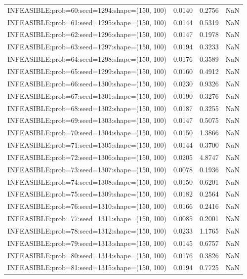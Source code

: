 \begin{longtable}{lccc}
INFEASIBLE:prob=60:seed=1294:shape=(150, 100)  &   0.0140 &  0.2756 &    NaN \\
INFEASIBLE:prob=61:seed=1295:shape=(150, 100)  &   0.0144 &  0.5319 &    NaN \\
INFEASIBLE:prob=62:seed=1296:shape=(150, 100)  &   0.0147 &  0.1978 &    NaN \\
INFEASIBLE:prob=63:seed=1297:shape=(150, 100)  &   0.0194 &  0.3233 &    NaN \\
INFEASIBLE:prob=64:seed=1298:shape=(150, 100)  &   0.0176 &  0.3589 &    NaN \\
INFEASIBLE:prob=65:seed=1299:shape=(150, 100)  &   0.0160 &  0.4912 &    NaN \\
INFEASIBLE:prob=66:seed=1300:shape=(150, 100)  &   0.0230 &  0.9326 &    NaN \\
INFEASIBLE:prob=67:seed=1301:shape=(150, 100)  &   0.0190 &  0.3276 &    NaN \\
INFEASIBLE:prob=68:seed=1302:shape=(150, 100)  &   0.0187 &  0.3255 &    NaN \\
INFEASIBLE:prob=69:seed=1303:shape=(150, 100)  &   0.0147 &  0.5075 &    NaN \\
INFEASIBLE:prob=70:seed=1304:shape=(150, 100)  &   0.0150 &  1.3866 &    NaN \\
INFEASIBLE:prob=71:seed=1305:shape=(150, 100)  &   0.0144 &  0.3700 &    NaN \\
INFEASIBLE:prob=72:seed=1306:shape=(150, 100)  &   0.0205 &  4.8747 &    NaN \\
INFEASIBLE:prob=73:seed=1307:shape=(150, 100)  &   0.0078 &  0.1936 &    NaN \\
INFEASIBLE:prob=74:seed=1308:shape=(150, 100)  &   0.0150 &  0.6201 &    NaN \\
INFEASIBLE:prob=75:seed=1309:shape=(150, 100)  &   0.0182 &  0.2564 &    NaN \\
INFEASIBLE:prob=76:seed=1310:shape=(150, 100)  &   0.0166 &  0.2416 &    NaN \\
INFEASIBLE:prob=77:seed=1311:shape=(150, 100)  &   0.0085 &  0.2001 &    NaN \\
INFEASIBLE:prob=78:seed=1312:shape=(150, 100)  &   0.0233 &  1.1765 &    NaN \\
INFEASIBLE:prob=79:seed=1313:shape=(150, 100)  &   0.0145 &  0.6757 &    NaN \\
INFEASIBLE:prob=80:seed=1314:shape=(150, 100)  &   0.0176 &  0.3826 &    NaN \\
INFEASIBLE:prob=81:seed=1315:shape=(150, 100)  &   0.0194 &  0.7725 &    NaN \\

\end{longtable}
